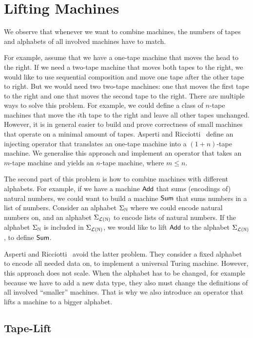 \chapter{Lifting Machines}
\label{chap:lifting}

We observe that whenever we want to combine machines, the numbers of tapes and alphabets of all involved machines have to match.

For example, assume that we have a one-tape machine that moves the head to the right.  If we need a two-tape machine that moves both tapes to the
right, we would like to use sequential composition and move one tape after the other tape to right.  But we would need two two-tape machines: one that
moves the first tape to the right and one that moves the second tape to the right.  There are multiple ways to solve this problem.  For example, we
could define a class of $n$-tape machines that move the $i$th tape to the right and leave all other tapes unchanged.  However, it is in general easier
to build and prove correctness of small machines that operate on a minimal amount of tapes.  Asperti and Ricciotti~\cite{asperti2015} define an
injecting operator that translates an one-tape machine into a $(1+n)$-tape machine.  We generalise this approach and implement an operator that takes
an $m$-tape machine and yields an $n$-tape machine, where $m \le n$.

The second part of this problem is how to combine machines with different alphabets.  For example, if we have a machine $\mathsf{Add}$ that sums
(encodings of) natural numbers, we could want to build a machine $\mathsf{Sum}$ that sums numbers in a list of numbers.  Consider an alphabet
$\Sigma_{\mathbb{N}}$ where we could encode natural numbers on, and an alphabet $\Sigma_{\mathcal{L}(\mathbb{N})}$ to encode lists of natural numbers.  If the alphabet
$\Sigma_{\mathbb{N}}$ is included in $\Sigma_{\mathcal{L}(\mathbb{N})}$, we would like to lift $\mathsf{Add}$ to the alphabet $\Sigma_{\mathcal{L}(\mathbb{N})}$, to define $\mathsf{Sum}$.

Asperti and Ricciotti~\cite{asperti2015} avoid the latter problem.  They consider a fixed alphabet to encode all needed data on, to implement a
universal Turing machine.  However, this approach does not scale.  When the alphabet has to be changed, for example because we have to add a new data
type, they also must change the definitions of all involved ``smaller'' machines.  That is why we also introduce an operator that lifts a machine to a
bigger alphabet.


\section{Tape-Lift}
\label{sec:n-Lift}
%

